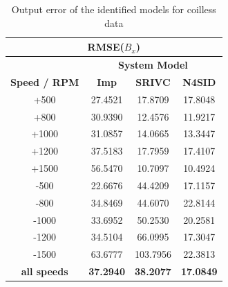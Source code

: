 \documentclass[english]{isasthesis}
\begin{document}
		 \begin{table}[t!]
		 \centering
	\begin{tabular}{|c|c|c|c|}

	\hline
	\multicolumn{4}{|c|}{\textbf{RMSE($B_x$)}}                        \\ \hline\hline
	\textbf{}            & \multicolumn{3}{c|}{\textbf{System Model}} \\ \hline
	\textbf{Speed / RPM} & \textbf{Imp}          & \textbf{SRIVC}         & \textbf{N4SID}       \\ 		\hline
	+500                 & 27.4521      & 17.8709       & 17.8048     \\ \cline{1-1}
	+800                 & 30.9390      & 12.4576       & 11.9217     \\ \cline{1-1}
	+1000                & 31.0857      & 14.0665       & 13.3447     \\ \cline{1-1}
	+1200                & 37.5183      & 17.7959       & 17.4107     \\ \cline{1-1}
	+1500                & 56.5470      & 10.7097       & 10.4924     \\ \cline{1-1}
	-500                 & 22.6676      & 44.4209       & 17.1157     \\ \cline{1-1}
	-800                 & 34.8469      & 44.6070       & 22.8144     \\ \cline{1-1}
	-1000                & 33.6952      & 50.2530       & 20.2581     \\ \cline{1-1}
	-1200                & 34.5104      & 66.0995       & 17.3047     \\ \cline{1-1}
	-1500                & 63.6777      & 103.7956      & 22.3813     \\ \hline\hline
	\textbf{all speeds}  & \textbf{37.2940}      & \textbf{38.2077}       & \textbf{17.0849}     \\ 		\hline
	\end{tabular}
	\caption{Output error of the identified models for coilless data}
	\label{table:sid results coilless}
	\end{table}
\end{document}
